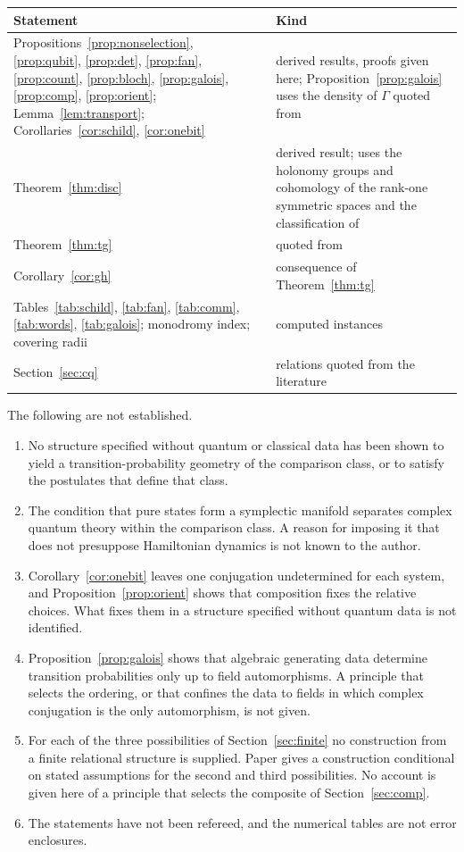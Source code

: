 \begin{center}\small
\begin{tabular}{@{}p{}p{}@{}}\toprule
Statement & Kind\\\midrule
Propositions~\ref{prop:nonselection}, \ref{prop:qubit}, \ref{prop:det}, \ref{prop:fan}, \ref{prop:count}, \ref{prop:bloch}, \ref{prop:galois}, \ref{prop:comp}, \ref{prop:orient}; Lemma~\ref{lem:transport}; Corollaries~\ref{cor:schild}, \ref{cor:onebit} & derived results, proofs given here; Proposition~\ref{prop:galois} uses the density of $\Gamma$ quoted from \cite{boykin}\\
Theorem~\ref{thm:disc} & derived result; uses the holonomy groups and cohomology of the rank-one symmetric spaces and the classification of \cite{bmu}\\
Theorem~\ref{thm:tg} & quoted from \cite{turing,gelander}\\
Corollary~\ref{cor:gh} & consequence of Theorem~\ref{thm:tg}\\
Tables~\ref{tab:schild}, \ref{tab:fan}, \ref{tab:comm}, \ref{tab:words}, \ref{tab:galois}; monodromy index; covering radii & computed instances\\
Section~\ref{sec:cq} & relations quoted from the literature\\\bottomrule
\end{tabular}
\end{center}

The following are not established.
\begin{enumerate}[label=(\roman*)]
\item No structure specified without quantum or classical data has been shown to yield a transition-probability geometry of the comparison class, or to satisfy the postulates that define that class.
\item The condition that pure states form a symplectic manifold separates complex quantum theory within the comparison class. A reason for imposing it that does not presuppose Hamiltonian dynamics is not known to the author.
\item Corollary~\ref{cor:onebit} leaves one conjugation undetermined for each system, and Proposition~\ref{prop:orient} shows that composition fixes the relative choices. What fixes them in a structure specified without quantum data is not identified.
\item Proposition~\ref{prop:galois} shows that algebraic generating data determine transition probabilities only up to field automorphisms. A principle that selects the ordering, or that confines the data to fields in which complex conjugation is the only automorphism, is not given.
\item For each of the three possibilities of Section~\ref{sec:finite} no construction from a finite relational structure is supplied. Paper \cite{g8} gives a construction conditional on stated assumptions for the second and third possibilities. No account is given here of a principle that selects the composite of Section~\ref{sec:comp}.
\item The statements have not been refereed, and the numerical tables are not error enclosures.
\end{enumerate}
